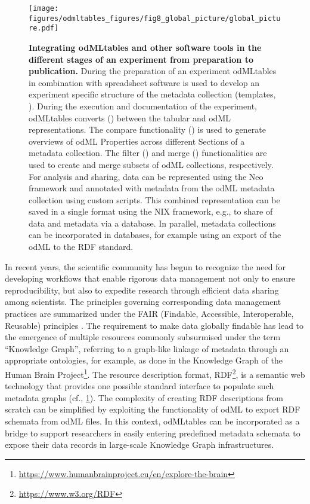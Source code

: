 {\begin{figure}[!ht]
\begin{center}
\texttt{[image: figures/odmltables\_figures/fig8\_global\_picture/global\_picture.pdf]}
\caption[Integrating odMLtables and other software tools in the different stages of an experiment from preparation to publication]{\label{fig:global_workflow}
\textbf{Integrating odMLtables and other software tools in the different stages of an experiment from preparation to publication.} During the preparation of an experiment odMLtables in combination with spreadsheet software is used to develop an experiment specific structure of the metadata collection (templates, \fgenerate{}). During the execution and documentation of the experiment, odMLtables converts (\fconvert{}) between the tabular and odML representations. The compare functionality (\fcompare{}) is used to generate overviews of odML Properties across different Sections of a metadata collection. The filter (\ffilter{}) and merge (\fmerge{}) functionalities are used to create and merge subsets of odML collections, respectively. For analysis and sharing, data can be represented using the Neo framework and annotated with metadata from the odML metadata collection using custom scripts. This combined representation can be saved in a single format using the NIX framework, e.g., to share of data and metadata via a database. In parallel, metadata collections can be incorporated in databases, for example using an export of the odML to the RDF standard.}
\end{center}
\end{figure}

In recent years, the scientific community has begun to recognize the need for developing workflows that enable rigorous data management not only to ensure reproducibility, but also to expedite research through efficient data sharing among scientists. The principles governing corresponding data management practices are summarized under the FAIR (Findable, Accessible, Interoperable, Reusable) principles \citep{Wilkinson_2016}. The requirement to make data globally findable has lead to the emergence of multiple resources commonly subsurmised under the term ``Knowledge Graph'', referring to a graph-like linkage of metadata through an appropriate ontologies, for example, as done in the Knowledge Graph of the Human Brain Project\footnote{\url{https://www.humanbrainproject.eu/en/explore-the-brain}}. The resource description format, RDF\footnote{\url{https://www.w3.org/RDF}}, is a semantic web technology that provides one possible standard interface to populate such metadata graphs (cf., \cref{fig:global_workflow}). The complexity of creating RDF descriptions from scratch can be simplified by exploiting the functionality of odML to export RDF schemata from odML files. In this context, odMLtables can be incorporated as a bridge to support researchers in easily entering predefined metadata schemata to expose their data records in large-scale Knowledge Graph infrastructures.

}
